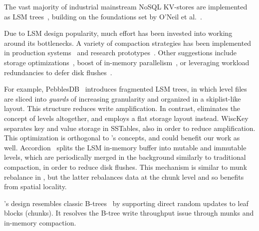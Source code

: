 

The vast majority of industrial mainstream NoSQL KV-stores are  implemented as LSM trees~\cite{hbase, 
RocksDB, scylladb, Bigtable2008, cassandra2010}, building on the foundations set by O'Neil 
et al.~\cite{O'Neil1996, Muth1998}. 

Due to LSM design popularity, much effort has been invested into working around its bottlenecks.
A variety of compaction strategies has been implemented in production systems~\cite{CallaghanCompaction, 
ScyllaCompaction} and research prototypes~\cite{triad, PebblesDB}. Other suggestions include storage
optimizations~\cite{WiscKey, PebblesDB}, boost of in-memory parallelism~\cite{scylladb, clsm2015}, or leveraging 
 workload redundancies to defer disk flushes~\cite{triad, accordion}. 

For example, PebblesDB~\cite{PebblesDB} introduces fragmented LSM trees, in which level files are 
sliced into {\em guards\/} of increasing granularity and organized in a skiplist-like layout. This structure 
reduces write amplification. In contrast, \sys\/ eliminates the concept of levels altogether, 
and employs a flat storage layout instead. WiscKey~\cite{WiscKey} separates key and value storage 
in SSTables, also in order to reduce amplification. This optimization is orthogonal to \sys's concepts,
and could benefit our work as well. Accordion~\cite{accordion} splits the LSM in-memory buffer into mutable 
and immutable levels, which are periodically merged in the background similarly to traditional compaction, 
in order to reduce disk flushes. This mechanism is similar to munk rebalance in \sys, 
but the latter rebalances data at the chunk level and so benefits from spatial locality.

\sys's design resembles classic B-trees~\cite{Knuth:1998:ACP:280635} by supporting direct random updates to leaf blocks (chunks). 
It resolves the B-tree write throughput issue through munks and in-memory compaction. 

